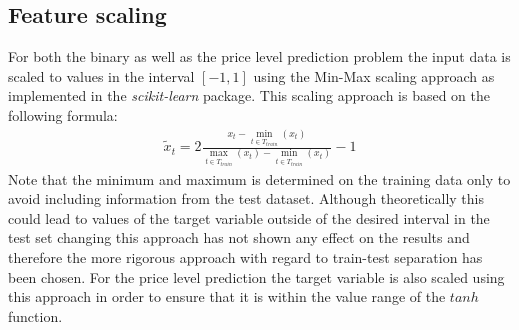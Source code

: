 \subsection{Feature scaling}
For both the binary as well as the price level prediction problem the input data is scaled to values in the interval $[-1,1]$ using the Min-Max scaling approach as implemented in the \textit{scikit-learn} package. This scaling approach is based on the following formula: \begin{align*}
\tilde{x}_t = 2\frac{x_t - \min_{t \in T_{train}}(x_t)}{\max_{t \in T_{train}}(x_t)-\min_{t \in T_{train}}(x_t)} - 1
\end{align*}
Note that the minimum and maximum is determined on the training data only to avoid including information from the test dataset. Although theoretically this could lead to values of the target variable outside of the desired interval in the test set changing this approach has not shown any effect on the results and therefore the more rigorous approach with regard to train-test separation has been chosen. For the price level prediction the target variable is also scaled using this approach in order to ensure that it is within the value range of the $tanh$ function.
